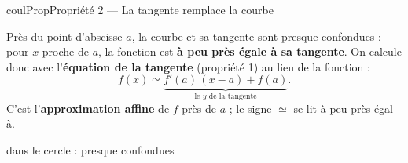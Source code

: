 \documentclass[11pt,a4paper]{article}
\makeatletter
\renewcommand{\approx}{\simeq}
\newcommand{\pt}[3]{\path (#1) node[croix]{} node[#2,font=\small,inner sep=2.5pt]{$#3$};}
\newcommand{\lycee@repere}[4]{%
  \draw[grille,step=1] (#1,#2) grid (#3,#4);
  \draw[-{Stealth[length=2mm]},thick] (#1,0)--({#3+0.4},0) node[below left=-1pt]{$x$};
  \draw[-{Stealth[length=2mm]},thick] (0,#2)--(0,{#4+0.4}) node[below left=-1pt]{$y$};
  \node[below left,font=\scriptsize,inner sep=1.5pt] at (0,0) {$0$};}
\newcommand{\lycee@gradx}[1]{\foreach \k/\l in {#1}{%
  \draw (\k,0.07)--(\k,-0.07) node[below,font=\scriptsize,inner sep=1.5pt]{$\l$};}}
\providecommand{\repere}{\lycee@repere}%
\providecommand{\gradx}{\lycee@gradx}%
\providecommand{\Cf}{\mathcal{C}\sb{f}}%
\newcounter{lycee@signet}
\newcommand{\signet}[3][]{\stepcounter{lycee@signet}%
  \edef\lycee@dest{\if\relax\detokenize{#1}\relax
    signet.\arabic{lycee@signet}\else#1\fi}%
  \hypertarget{\lycee@dest}{}\bookmark[level=#2,dest=\lycee@dest]{#3}}
\newenvironment{proprietebox}[1][Propriété]%
  {\begin{boitecours}[phantom={\signet{2}{#1}}]{coulProp}{#1}}{\end{boitecours}}
\makeatother
\begin{document}
\begin{proprietebox}[Propriété 2 --- La tangente remplace la courbe]
\begin{minipage}[c]{0.6\linewidth}\raggedright
Près du point d'abscisse $a$, la courbe et sa tangente sont presque confondues : pour
$x$ proche de $a$, la fonction est \textbf{à peu près égale à sa tangente}. On calcule
donc avec l'\textbf{équation de la tangente} (propriété 1) au lieu de la fonction :
\[
  f(x)\approx \underbrace{f'(a)\,(x-a)+f(a)}_{\text{le $y$ de la tangente}}.
\]
C'est l'\textbf{approximation affine} de $f$ près de $a$ ; le signe $\approx$ se lit
\og à peu près égal à\fg.
\end{minipage}\hfill
\begin{minipage}[c]{0.36\linewidth}\centering
{}\par
{\footnotesize dans le cercle : presque confondues}
\end{minipage}
\end{proprietebox}
\end{document}
